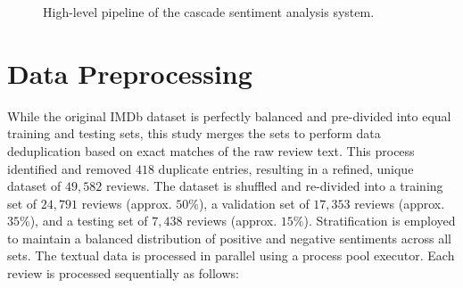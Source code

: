 \documentclass[a4paper,twoside,12pt]{book}
\begin{document}
\begin{figure}[htbp]
	\caption{High-level pipeline of the cascade sentiment analysis system.}
	\label{fig:pipeline}
\end{figure}

\section{Data Preprocessing} \label{sec:preprocessing}

While the original IMDb dataset is perfectly balanced and pre-divided into equal training and testing sets, this study merges the sets to perform data deduplication based on exact matches of the raw review text. This process identified and removed $418$ duplicate entries, resulting in a refined, unique dataset of $49{,}582$ reviews. The dataset is shuffled and re-divided into a training set of $24{,}791$ reviews (approx. $50\%$), a validation set of $17{,}353$ reviews (approx. $35\%$), and a testing set of $7{,}438$ reviews (approx. $15\%$). Stratification is employed to maintain a balanced distribution of positive and negative sentiments across all sets. The textual data is processed in parallel using a process pool executor. Each review is processed sequentially as follows:
\end{document}
